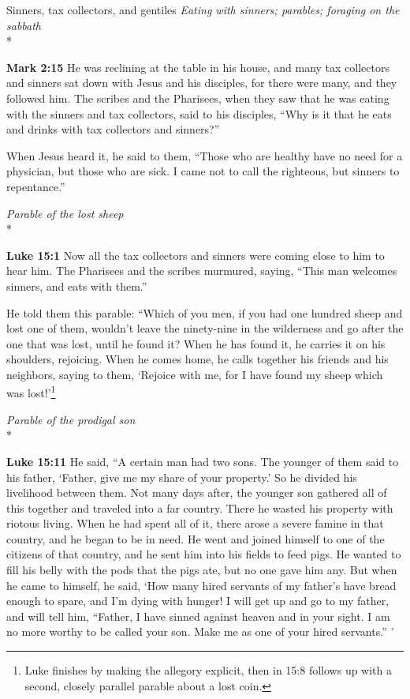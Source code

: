 \documentclass[10pt,twoside]{article} %
\newcommand{\quotesize}{\normalsize{}}
\newenvironment{quotetext}{\begingroup\quotesize}{\endgroup}
\newcommand{\intex}[1]{\index[texts]{#1}}
\newcommand{\bible}[2]{\begin{quotetext}\textbf{#1}\intex{#1} #2\end{quotetext}}
\newcommand{\gospelmark}[2]{\bible{Mark #1}{#2}}
\newcommand{\luke}[2]{\bible{Luke #1}{#2}}
\newcommand{\subhead}[1]{\emph{#1}\\*}
\begin{document}
\begin{section}{Sinners, tax collectors, and gentiles}
\subhead{Eating with sinners; parables; foraging on the sabbath}

\gospelmark{2:15}{  He was reclining at the table in his house, and many tax collectors and sinners sat down with Jesus and his disciples, for there were many, and they followed him.   The scribes and the Pharisees, when they saw that he was eating with the sinners and tax collectors, said to his disciples, ``Why is it that he eats and drinks with tax collectors and sinners?''

  When Jesus heard it, he said to them, ``Those who are healthy have no need for a physician, but those who are sick. I came not to call the righteous, but sinners to repentance.''}

\subhead{Parable of the lost sheep}

\luke{15:1}{Now all the tax collectors and sinners were coming close to him to hear him.   The Pharisees and the scribes murmured, saying, ``This man welcomes sinners, and eats with them.''

  He told them this parable:    ``Which of you men, if you had one hundred sheep and lost one of them, wouldn't leave the ninety-nine in the wilderness and go after the one that was lost, until he found it?    When he has found it, he carries it on his shoulders, rejoicing.    When he comes home, he calls together his friends and his neighbors, saying to them, `Rejoice with me, for I have found my sheep which was lost!'\footnote{Luke
finishes by making the allegory explicit, then in 15:8 follows up
with a second, closely parallel parable about a lost coin.}
}

\subhead{Parable of the prodigal son}

\luke{15:11}{
  He said, ``A certain man had two sons.    The younger of them said to his father, `Father, give me my share of your property.' So he divided his livelihood between them.    Not many days after, the younger son gathered all of this together and traveled into a far country. There he wasted his property with riotous living.    When he had spent all of it, there arose a severe famine in that country, and he began to be in need.    He went and joined himself to one of the citizens of that country, and he sent him into his fields to feed pigs.    He wanted to fill his belly with the pods that the pigs ate, but no one gave him any.    But when he came to himself, he said, `How many hired servants of my father's have bread enough to spare, and I'm dying with hunger!    I will get up and go to my father, and will tell him, ``Father, I have sinned against heaven and in your sight.    I am no more worthy to be called your son. Make me as one of your hired servants.'' '

}
\end{section}
\end{document}
